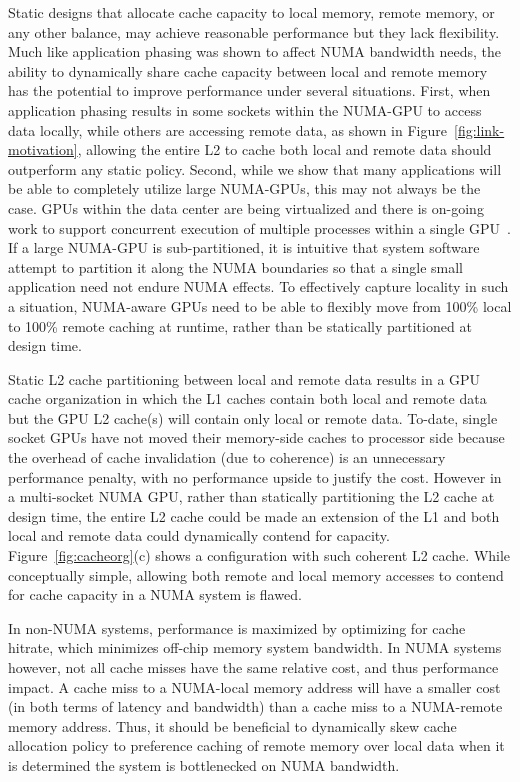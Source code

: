 Static designs that allocate cache capacity to local memory, remote memory, 
or any other balance, may achieve reasonable performance but they lack 
flexibility. Much like application phasing was shown to affect NUMA bandwidth 
needs, the ability to dynamically share cache capacity between local and 
remote memory has the potential to improve performance under several 
situations. First, when application phasing results in some sockets within 
the NUMA-GPU to access data locally, while others are accessing remote data, 
as shown in Figure~\ref{fig:link-motivation}, allowing the entire L2 to cache 
both local and remote data should outperform any static policy. Second, while 
we show that many applications will be able to completely utilize large 
NUMA-GPUs, this may not always be the case. GPUs within the data center are 
being virtualized and there is on-going work to support concurrent execution 
of multiple processes within a single GPU~\cite{park2015chimera, 
lin2016enabling}. If a large NUMA-GPU is sub-partitioned, it is intuitive 
that system software attempt to partition it along the NUMA boundaries so 
that a single small application need not endure NUMA effects. To effectively 
capture locality in such a situation, NUMA-aware GPUs need to be able to 
flexibly move from 100\% local to 100\% remote caching at runtime, rather 
than be statically partitioned at design time. 

Static L2 cache partitioning between local and remote data results in a GPU 
cache organization in which the L1 caches contain both local and remote data 
but the GPU L2 cache(s) will contain only local or remote data.  To-date, 
single socket GPUs have not moved their memory-side caches to processor side 
because the overhead of cache invalidation (due to coherence) is an 
unnecessary performance penalty, with no performance upside to justify the 
cost. However in a multi-socket NUMA GPU, rather than statically 
partitioning the L2 cache at design time, the entire L2 cache could be made 
an extension of the L1 and both local and remote data could dynamically 
contend for capacity. Figure~\ref{fig:cacheorg}(c) shows a configuration with 
such coherent L2 cache. While conceptually simple, allowing both remote and 
local memory accesses to contend for cache capacity in a NUMA system is flawed.

In non-NUMA systems, performance is maximized by optimizing for cache 
hitrate, which minimizes off-chip memory system bandwidth. In NUMA systems 
however, not all cache misses have the same relative cost, and thus 
performance impact. A cache miss to a NUMA-local memory address will have a 
smaller cost (in both terms of latency and bandwidth) than a cache miss to a 
NUMA-remote memory address. Thus, it should be beneficial to dynamically 
skew cache allocation policy to preference caching of remote memory over 
local data when it is determined the system is bottlenecked on NUMA bandwidth.



